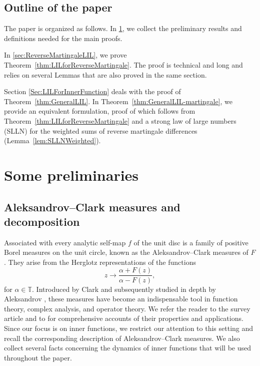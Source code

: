 \documentclass[12pt, reqno, final, a4paper]{amsart}
\theoremstyle{plain}
\theoremstyle{definition}
\theoremstyle{remark}
\newcommand{\1}{\mathbf 1}
\begin{document}
\subsection{Outline of the paper}
The paper is organized as follows. In \cref{sec:preliminaries}, we collect the preliminary results and definitions needed for the main proofs. 

In \cref{sec:ReverseMartingaleLIL}, we prove Theorem~\ref{thm:LILforReverseMartingale}. The proof is technical and long and relies on several Lemmas that are also proved in the same section. 

Section \ref{Sec:LILForInnerFunction} deals with the proof of Theorem~\ref{thm:GeneralLIL}. In Theorem~\ref{thm:GeneralLIL-martingale}, we provide an equivalent formulation, proof of which follows from Theorem~\ref{thm:LILforReverseMartingale} and a strong law of large numbers (SLLN) for the weighted sums of reverse martingale differences (Lemma~\ref{lem:SLLNWeighted}).




\section{Some preliminaries}\label{sec:preliminaries}

\subsection{Aleksandrov--Clark measures and decomposition}\label{subsection_AC}
Associated with every analytic self-map $f$ of the unit disc is a family of positive Borel measures on the unit circle, known as the Aleksandrov--Clark measures of $F$. They arise from the Herglotz representations of the functions $$
z\rightarrow\frac{\alpha+F(z)}{\alpha-F(z)},$$ 
for $\alpha\in\mathbb T$. Introduced by Clark \cite{Clark} and subsequently studied in depth by Aleksandrov \cite{AL1, AL2, AL3}, these measures have become an indispensable tool in function theory, complex analysis, and operator theory. We refer the reader to the survey article \cite{poltoratski2006aleksandrov} and to \cite[Chapter IX]{cima2006cauchy} for comprehensive accounts of their properties and applications. Since our focus is on inner functions, we restrict our attention to this setting and recall the corresponding description of Aleksandrov--Clark measures. We also collect several facts concerning the dynamics of inner functions that will be used throughout the paper. 
\end{document}
